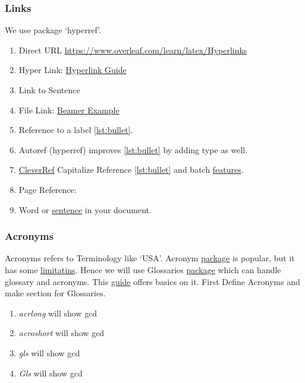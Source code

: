 \documentclass{report}[a4paper,12pt] %
\begin{document}
\subsubsection{Links}
We use package `hyperref'.

\begin{enumerate}
  \item Direct URL \url{https://www.overleaf.com/learn/latex/Hyperlinks}
  \item Hyper Link: \href{https://www.overleaf.com/learn/latex/Hyperlinks}{Hyperlink Guide}
  \item Link to Sentence
  \item File Link: \href{run:../../presentation/beamer/tutorial.tex}{Beamer Example}
  \item Reference to a label \ref{lst:bullet}.
  \item Autoref (hyperref) improves \autoref{lst:bullet} by adding type as well.
  \item \href{https://ctan.org/pkg/cleveref}{CleverRef} Capitalize Reference \cref{lst:bullet} and batch \href{https://texblog.org/2013/05/06/cleveref-a-clever-way-to-reference-in-latex/}{features}.
  \item Page Reference: \pageref{fig:coffee}
  \item Word or \hyperlink{sen:formatopts}{sentence} in your document.
\end{enumerate}

\subsubsection{Acronyms} \label{sec:acronyms}
Acronyms refers to Terminology like `USA'.
Acronym \href{https://ctan.org/pkg/acronym}{package} is popular, but it has some \href{https://tex.stackexchange.com/questions/29348/problem-using-package-acronym}{limitatins}.
Hence we will use Glossaries \href{https://ctan.org/pkg/glossaries}{package} which can handle glossary and acronyms.
This \href{https://www.overleaf.com/learn/latex/Glossaries}{guide} offers basics on it.
First Define Acronyms and make section for Glossaries.

\begin{enumerate}
  \item \emph{acrlong} will show \acrlong{gcd}
  \item \emph{acroshort} will show \acrshort{gcd}
  \item \emph{gls} will show \gls{gcd}
  \item \emph{Gls} will show \Gls{gcd}
\end{enumerate}
\end{document}
